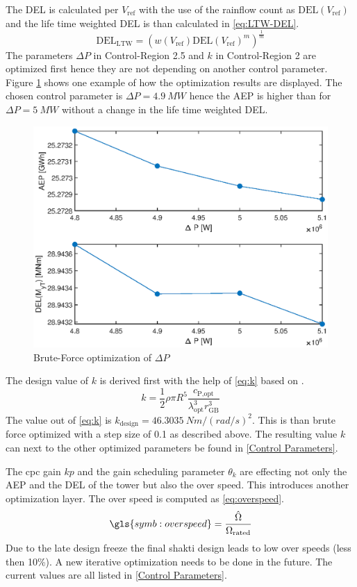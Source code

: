 The \gls{DEL} is calculated per $V_{\text{ref}}$ with the use of the rainflow count as $\text{DEL}(V_{\text{ref}})$ and the life time weighted \gls{DEL} is than calculated in \ref{eq:LTW-DEL}.
\begin{equation}
	\text{DEL}_{\text{LTW}} = \left(w(V_{\text{ref}})\text{DEL}(V_{\text{ref}})^m\right)^{\frac{1}{m}} 
	\label{eq:LTW-DEL}
\end{equation}
The parameters $\Delta P$ in Control-Region 2.5 and  $k$ in Control-Region 2 are optimized first hence they are not depending on another control parameter. Figure \ref{fig:DeltaP} shows one example of how the optimization results are displayed. The chosen control parameter is $\Delta P = \SI{4.9}{MW}$ hence the \gls{AEP} is higher than for $\Delta P = \SI{5}{MW}$ without a change in the life time weighted \gls{DEL}.
\begin{figure}[h]
	\centering	
	\includegraphics[width=12cm]{Figures/DeltaPopt.eps}
	\caption{Brute-Force optimization of $\Delta P$}
	\label{fig:DeltaP}
\end{figure}

The design value of $k$ is derived first with the help of \ref{eq:k} based on \cite{SchlipfLecture}.
\begin{equation}
	k = \frac{1}{2}\rho\pi R^5 \frac{c_{\text{P,opt}}}{\lambda_{\text{opt}}^3 r_{\text{GB}}^3}
	\label{eq:k}
\end{equation}
The value out of \ref{eq:k} is $k_{\text{design}} = \SI{46.3035}{Nm/(rad/s)^2}$. This is than brute force optimized with a step size of 0.1 as described above.
The resulting value $k$ can next to the other optimized parameters be found in \ref{Control Parameters}. 

The \gls{cpc} gain $kp$ and the gain scheduling parameter $\theta_k$ are effecting not only the \gls{AEP} and the \gls{DEL} of the tower but also the over speed. This introduces another optimization layer. The over speed is computed as \ref{eq:overspeed}. 
\begin{equation}
	\gls{symb:overspeed} = \frac{\hat{\Omega}}{\Omega_{\textnormal{rated}}}
	\label{eq:overspeed}
\end{equation}  
Due to the late design freeze the final \gls{shakti} design leads to low over speeds (less then 10\%). 
A new iterative optimization needs to be done in the future.
The current values are all listed in \ref{Control Parameters}.